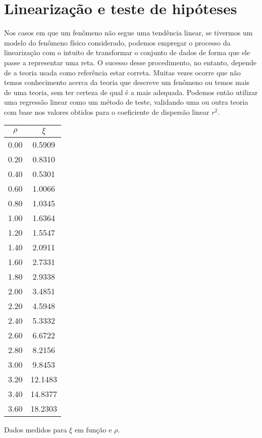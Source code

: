 \section{Linearização e teste de hipóteses}

Nos casos em que um fenômeno não segue uma tendência linear, se tivermos um modelo do fenômeno físico considerado, podemos empregar o processo da linearização com o intuito de transformar o conjunto de dados de forma que ele passe a representar uma reta. O sucesso desse procedimento, no entanto, depende de a teoria usada como referência estar correta. Muitas vezes ocorre que não temos conhecimento acerca da teoria que descreve um fenômeno ou temos mais de uma teoria, sem ter certeza de qual é a mais adequada. Podemos então utilizar uma regressão linear como um método de teste, validando uma ou outra teoria com base nos valores obtidos para o coeficiente de dispersão linear $r^2$.

\begin{margintable}
\centering
\begin{tabular}{cc}
\toprule
$\rho$ & $\xi$     \\
\midrule
0.00    & 0.5909   \\ 
0.20    & 0.8310   \\
0.40    & 0.5301   \\
0.60    & 1.0066   \\
0.80    & 1.0345   \\
1.00    & 1.6364   \\
1.20    & 1.5547   \\
1.40    & 2.0911   \\
1.60    & 2.7331   \\
1.80    & 2.9338   \\
2.00    & 3.4851   \\
2.20    & 4.5948   \\
2.40    & 5.3332   \\
2.60    & 6.6722   \\
2.80    & 8.2156   \\
3.00    & 9.8453   \\
3.20    & 12.1483  \\
3.40    & 14.8377  \\
3.60    & 18.2303  \\
\bottomrule
\end{tabular}
\vspace{1mm}
\caption{Dados medidos para $\xi$ em função e $\rho$. \label{TabelaMedidasIniciais}}
\end{margintable}


